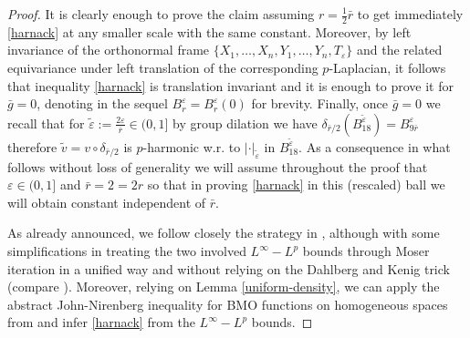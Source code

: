\documentclass[10pt]{amsart}
\numberwithin{equation}{section}
\theoremstyle{definition}
\begin{document}
\begin{proof}
It is clearly enough to prove the claim assuming $ r=\frac12 \bar{r}$ to get immediately \eqref{harnack} at any smaller scale with the same constant. Moreover, by left invariance of the orthonormal frame $\{X_1, \ldots,X_n,Y_1, \ldots, Y_n, T_\varepsilon\}$ and the related equivariance under left translation of the corresponding $p$-Laplacian, it follows that inequality \eqref{harnack} is translation invariant and it is enough to prove it for $\bar{g}=0$, denoting in the sequel $B^\varepsilon_r=B^\varepsilon_r(0)$ for brevity.  Finally, once $\bar{g}=0$ we recall that for $\widetilde{\varepsilon}:=\frac{2\varepsilon}{\bar{r}} \in(0,1]$ by group dilation we have $\delta_{\bar{r}/2}(B_{18}^{\widetilde{\varepsilon}})=B^\varepsilon_{9 \bar{r}}$ therefore $\tilde{v}=v \circ \delta_{\bar{r}/2}$ is $p$-harmonic w.r. to $| \cdot|_{\widetilde{\varepsilon}}$ in $ B_{18}^{\widetilde{\varepsilon}} $. As a consequence in what follows without loss of generality we will assume throughout the proof that $\varepsilon \in (0,1]$ and $\bar{r}=2=2r$ so that in proving \eqref{harnack} in this (rescaled) ball we will obtain constant independent of $\bar{r}$.

As already announced, we follow closely the strategy in \cite{CapDanGar}, although with some simplifications in treating the two involved $L^\infty-L^p$ bounds through Moser iteration in a unified way and without relying on the Dahlberg and Kenig trick (compare \cite[Lemma 3.29]{CapDanGar}). Moreover, relying on Lemma \ref{uniform-density},
we can apply the abstract John-Nirenberg inequality for BMO functions on homogeneous spaces from \cite{Burger} and infer \eqref{harnack} from the  $L^\infty-L^p$ bounds.



\end{proof}
\end{document}
